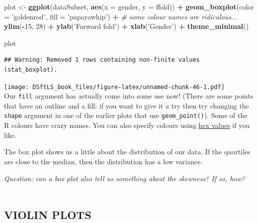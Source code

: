 \documentclass[
]{book}
\newenvironment{Shaded}{\begin{snugshade}}{\end{snugshade}}
\newcommand{\CommentTok}[1]{\textcolor[rgb]{0.56,0.35,0.01}{\textit{#1}}}
\newcommand{\DataTypeTok}[1]{\textcolor[rgb]{0.13,0.29,0.53}{#1}}
\newcommand{\DecValTok}[1]{\textcolor[rgb]{0.00,0.00,0.81}{#1}}
\newcommand{\KeywordTok}[1]{\textcolor[rgb]{0.13,0.29,0.53}{\textbf{#1}}}
\newcommand{\NormalTok}[1]{#1}
\newcommand{\OperatorTok}[1]{\textcolor[rgb]{0.81,0.36,0.00}{\textbf{#1}}}
\newcommand{\StringTok}[1]{\textcolor[rgb]{0.31,0.60,0.02}{#1}}
\begin{document}
\begin{Shaded}
\begin{Highlighting}[]
\NormalTok{plot <-}\StringTok{ }\KeywordTok{ggplot}\NormalTok{(dataSubset, }\KeywordTok{aes}\NormalTok{(}\DataTypeTok{x =}\NormalTok{ gender, }\DataTypeTok{y =}\NormalTok{ ffold)) }\OperatorTok{+}
\StringTok{    }\KeywordTok{geom_boxplot}\NormalTok{(}\DataTypeTok{color =} \StringTok{'goldenrod'}\NormalTok{, }\DataTypeTok{fill =} \StringTok{'papayawhip'}\NormalTok{) }\OperatorTok{+}\StringTok{ }
\StringTok{        }\CommentTok{# some colour names are ridiculous...}
\StringTok{    }\KeywordTok{ylim}\NormalTok{(}\OperatorTok{-}\DecValTok{15}\NormalTok{, }\DecValTok{28}\NormalTok{) }\OperatorTok{+}\StringTok{ }\KeywordTok{ylab}\NormalTok{(}\StringTok{'Forward fold'}\NormalTok{) }\OperatorTok{+}\StringTok{ }\KeywordTok{xlab}\NormalTok{(}\StringTok{'Gender'}\NormalTok{) }\OperatorTok{+}
\StringTok{    }\KeywordTok{theme_minimal}\NormalTok{()}

\NormalTok{plot}
\end{Highlighting}
\end{Shaded}

\begin{verbatim}
## Warning: Removed 1 rows containing non-finite values (stat_boxplot).
\end{verbatim}

\texttt{[image: DSftLS\_book\_files/figure-latex/unnamed-chunk-46-1.pdf]}\\

Our \texttt{fill} argument has actually come into some use now! (There are some
points that have an outline and a fill: if you want to give it a try then try
changing the \texttt{shape} argument in one of the earlier plots that use
\texttt{geom\_point()}). Some of the R colours have crazy names. You can also specify
colours using \href{https://www.w3schools.com/colors/colors_picker.asp}{hex values}
if you like.

The box plot shows us a little about the distribution of our data. If the
quartiles are close to the median, then the distribution has a low variance.

\emph{Question: can a box plot also tell us something about the skewness? If so, how?}\\
~\\

\hypertarget{violin-plots}{%
\subsection{VIOLIN PLOTS}\label{violin-plots}}
\end{document}
